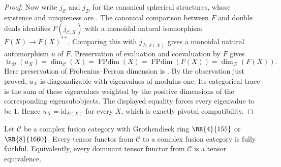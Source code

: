 \begin{proof}
Now write $j_{\mathcal C}$ and $j_{\mathcal D}$ for the canonical
spherical structures, whose existence and uniqueness are
\cite[Proposition~9.5.1]{EGNO}. The canonical comparison between $F$ and
double duals identifies $F(j_{\mathcal C,X})$ with a monoidal natural
isomorphism $F(X)\to F(X)^{**}$. Comparing this with
$j_{\mathcal D,F(X)}$ gives a monoidal natural automorphism
$u$ of $F$. Preservation of evaluation and coevaluation by $F$ gives
\[
 \operatorname{tr}_{\mathcal D}(u_X)
 =\dim_{\mathcal C}(X)
 =\operatorname{FPdim}(X)
 =\operatorname{FPdim}(F(X))
 =\dim_{\mathcal D}(F(X)).
\]
Here preservation of Frobenius--Perron dimension is
\cite[Proposition~4.5.7]{EGNO}. By the observation just proved, $u_X$ is
diagonalizable with eigenvalues of modulus one. Its categorical trace
is the sum of these eigenvalues weighted by the positive dimensions
of the corresponding eigensubobjects. The displayed equality forces
every eigenvalue to be $1$. Hence $u_X=\mathrm{id}_{F(X)}$ for every
$X$, which is exactly pivotal compatibility.
\end{proof}

\begin{theorem}
\label{thm:frontier-all-tensor-functors}
Let $\mathcal C$ be a complex fusion category with Grothendieck ring
$\RR{4}{155}$ or $\RR{8}{1660}$. Every tensor functor from
$\mathcal C$ to a complex fusion category is fully faithful.
Equivalently, every dominant tensor functor from $\mathcal C$ is a
tensor equivalence.
\end{theorem}

